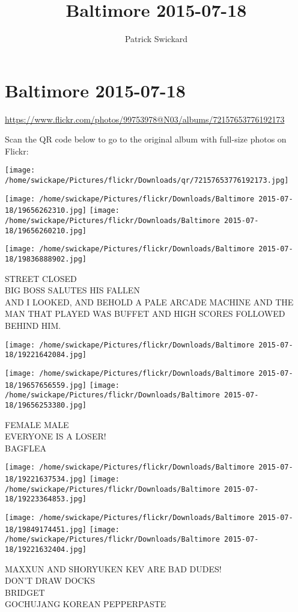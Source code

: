 \documentclass[10pt,letterpaper]{article}
\title{Baltimore 2015-07-18}
\author{Patrick Swickard}
\date{}
\begin{document}
\section*{Baltimore 2015-07-18}

\url{https://www.flickr.com/photos/99753978@N03/albums/72157653776192173}

Scan the QR code below to go to the original album with full-size photos on Flickr:

\texttt{[image: /home/swickape/Pictures/flickr/Downloads/qr/72157653776192173.jpg]}
\pagebreak

\texttt{[image: /home/swickape/Pictures/flickr/Downloads/Baltimore 2015-07-18/19656262310.jpg]}
\texttt{[image: /home/swickape/Pictures/flickr/Downloads/Baltimore 2015-07-18/19656260210.jpg]}

\vspace{0.25in}
\texttt{[image: /home/swickape/Pictures/flickr/Downloads/Baltimore 2015-07-18/19836888902.jpg]}

STREET CLOSED\\
BIG BOSS SALUTES HIS FALLEN\\
AND I LOOKED, AND BEHOLD A PALE ARCADE MACHINE AND THE MAN THAT PLAYED WAS BUFFET AND HIGH SCORES FOLLOWED BEHIND HIM.
\pagebreak

\texttt{[image: /home/swickape/Pictures/flickr/Downloads/Baltimore 2015-07-18/19221642084.jpg]}

\vspace{0.25in}
\texttt{[image: /home/swickape/Pictures/flickr/Downloads/Baltimore 2015-07-18/19657656559.jpg]}
\texttt{[image: /home/swickape/Pictures/flickr/Downloads/Baltimore 2015-07-18/19656253380.jpg]}

FEMALE MALE\\
EVERYONE IS A LOSER!\\
BAGFLEA
\pagebreak

\texttt{[image: /home/swickape/Pictures/flickr/Downloads/Baltimore 2015-07-18/19221637534.jpg]}
\texttt{[image: /home/swickape/Pictures/flickr/Downloads/Baltimore 2015-07-18/19223364853.jpg]}

\texttt{[image: /home/swickape/Pictures/flickr/Downloads/Baltimore 2015-07-18/19849174451.jpg]}
\texttt{[image: /home/swickape/Pictures/flickr/Downloads/Baltimore 2015-07-18/19221632404.jpg]}

MAXXUN AND SHORYUKEN KEV ARE BAD DUDES!\\
DON'T DRAW DOCKS\\
BRIDGET\\
GOCHUJANG KOREAN PEPPERPASTE
\pagebreak
\end{document}
